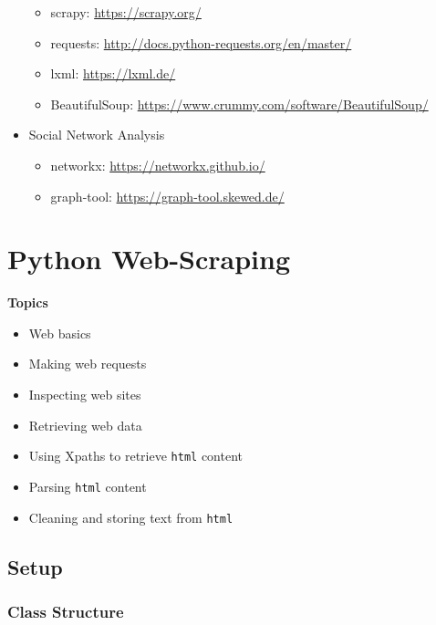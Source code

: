 \documentclass[]{book}
\providecommand{\tightlist}{%
  \setlength{\itemsep}{0pt}\setlength{\parskip}{0pt}}
\begin{document}
\begin{itemize}
  \begin{itemize}
  \tightlist
  \item
    scrapy: \url{https://scrapy.org/}
  \item
    requests: \url{http://docs.python-requests.org/en/master/}
  \item
    lxml: \url{https://lxml.de/}
  \item
    BeautifulSoup: \url{https://www.crummy.com/software/BeautifulSoup/}
  \end{itemize}
\item
  Social Network Analysis

  \begin{itemize}
  \tightlist
  \item
    networkx: \url{https://networkx.github.io/}
  \item
    graph-tool: \url{https://graph-tool.skewed.de/}
  \end{itemize}
\end{itemize}

\hypertarget{python-web-scraping}{%
\chapter{Python Web-Scraping}\label{python-web-scraping}}

\textbf{Topics}

\begin{itemize}
\tightlist
\item
  Web basics
\item
  Making web requests
\item
  Inspecting web sites
\item
  Retrieving web data
\item
  Using Xpaths to retrieve \texttt{html} content
\item
  Parsing \texttt{html} content
\item
  Cleaning and storing text from \texttt{html}
\end{itemize}

\hypertarget{setup-5}{%
\section{Setup}\label{setup-5}}

\hypertarget{class-structure-5}{%
\subsection{Class Structure}\label{class-structure-5}}
\end{document}
